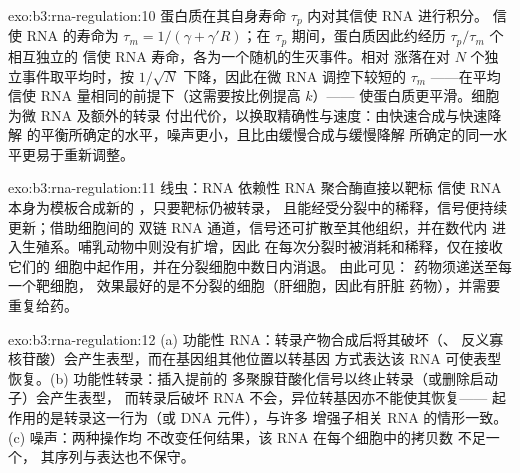 \begin{solution}{exo:b3:rna-regulation:10}
蛋白质在其自身寿命 $\tau_{p}$ 内对其信使 RNA 进行积分。
信使 RNA 的寿命为 $\tau_{m} = 1/(\gamma + \gamma' R)$；在 $\tau_{p}$
期间，蛋白质因此约经历 $\tau_{p}/\tau_{m}$ 个相互独立的
信使 RNA 寿命，各为一个随机的生灭事件。相对
涨落在对 $N$ 个独立事件取平均时，按
$1/\sqrt{N}$ 下降，因此在微 RNA 调控下较短的 $\tau_{m}$
——在平均信使 RNA 量相同的前提下（这需要按比例提高 $k$）——
使蛋白质更平滑。细胞为微 RNA 及额外的转录
付出代价，以换取精确性与速度：由快速合成与快速降解
的平衡所确定的水平，噪声更小，且比由缓慢合成与缓慢降解
所确定的同一水平更易于重新调整。
\end{solution}

\begin{solution}{exo:b3:rna-regulation:11}
线虫：RNA 依赖性 RNA 聚合酶直接以靶标
信使 RNA 本身为模板合成新的 ，只要靶标仍被转录，
且能经受分裂中的稀释，信号便持续更新；借助细胞间的
双链 RNA 通道，信号还可扩散至其他组织，并在数代内
进入生殖系。哺乳动物中则没有扩增，因此
 在每次分裂时被消耗和稀释，仅在接收它们的
细胞中起作用，并在分裂细胞中数日内消退。
由此可见： 药物须递送至每一个靶细胞，
效果最好的是不分裂的细胞（肝细胞，因此有肝脏
药物），并需要重复给药。
\end{solution}

\begin{solution}{exo:b3:rna-regulation:12}
(a) 功能性 RNA：转录产物合成后将其破坏（、
反义寡核苷酸）会产生表型，而在基因组其他位置以转基因
方式表达该 RNA 可使表型恢复。(b) 功能性转录：插入提前的
多聚腺苷酸化信号以终止转录（或删除启动子）会产生表型，
而转录后破坏 RNA 不会，异位转基因亦不能使其恢复——
起作用的是转录这一行为（或 DNA 元件），与许多
增强子相关 RNA 的情形一致。(c) 噪声：两种操作均
不改变任何结果，该 RNA 在每个细胞中的拷贝数
不足一个，
其序列与表达也不保守。
\end{solution}

